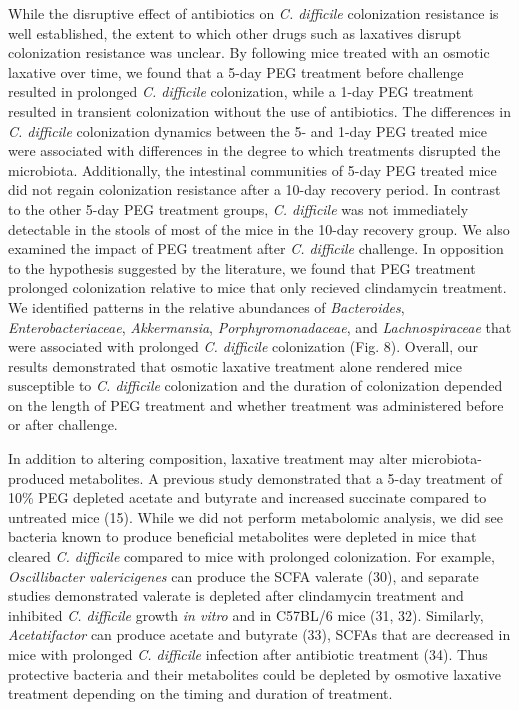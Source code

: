 \documentclass[
  11pt,
]{article}
\begin{document}
While the disruptive effect of antibiotics on \emph{C. difficile}
colonization resistance is well established, the extent to which other
drugs such as laxatives disrupt colonization resistance was unclear. By
following mice treated with an osmotic laxative over time, we found that
a 5-day PEG treatment before challenge resulted in prolonged \emph{C.
difficile} colonization, while a 1-day PEG treatment resulted in
transient colonization without the use of antibiotics. The differences
in \emph{C. difficile} colonization dynamics between the 5- and 1-day
PEG treated mice were associated with differences in the degree to which
treatments disrupted the microbiota. Additionally, the intestinal
communities of 5-day PEG treated mice did not regain colonization
resistance after a 10-day recovery period. In contrast to the other
5-day PEG treatment groups, \emph{C. difficile} was not immediately
detectable in the stools of most of the mice in the 10-day recovery
group. We also examined the impact of PEG treatment after \emph{C.
difficile} challenge. In opposition to the hypothesis suggested by the
literature, we found that PEG treatment prolonged colonization relative
to mice that only recieved clindamycin treatment. We identified patterns
in the relative abundances of \emph{Bacteroides},
\emph{Enterobacteriaceae}, \emph{Akkermansia},
\emph{Porphyromonadaceae}, and \emph{Lachnospiraceae} that were
associated with prolonged \emph{C. difficile} colonization (Fig. 8).
Overall, our results demonstrated that osmotic laxative treatment alone
rendered mice susceptible to \emph{C. difficile} colonization and the
duration of colonization depended on the length of PEG treatment and
whether treatment was administered before or after challenge.

In addition to altering composition, laxative treatment may alter
microbiota-produced metabolites. A previous study demonstrated that a
5-day treatment of 10\% PEG depleted acetate and butyrate and increased
succinate compared to untreated mice (15). While we did not perform
metabolomic analysis, we did see bacteria known to produce beneficial
metabolites were depleted in mice that cleared \emph{C. difficile}
compared to mice with prolonged colonization. For example,
\emph{Oscillibacter valericigenes} can produce the SCFA valerate (30),
and separate studies demonstrated valerate is depleted after clindamycin
treatment and inhibited \emph{C. difficile} growth \emph{in vitro} and
in C57BL/6 mice (31, 32). Similarly, \emph{Acetatifactor} can produce
acetate and butyrate (33), SCFAs that are decreased in mice with
prolonged \emph{C. difficile} infection after antibiotic treatment (34).
Thus protective bacteria and their metabolites could be depleted by
osmotive laxative treatment depending on the timing and duration of
treatment.
\end{document}
